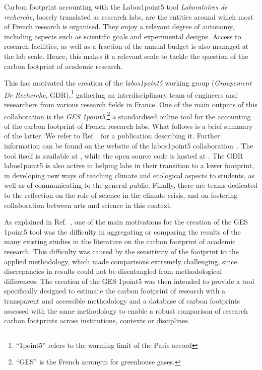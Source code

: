 \documentclass[../SustainableHEP.tex]{subfiles}
\begin{document}
\begin{bestpractice}
{Carbon footprint accounting with the Labos1point5 tool}%
\noindent \emph{Laboratoires de recherche}, loosely translated as research labs,
are the entities around which most of French research is organised.
They enjoy a relevant degree of autonomy, including 
aspects such as scientific goals and experimental designs. 
Access to research facilities, as well as 
a fraction of the annual budget is also managed at the lab scale.
Hence, this makes it a relevant scale to tackle the question 
of the carbon footprint of academic research. 

This has motivated the creation of the \emph{labos1point5} 
working group (\emph{Groupement De Recherche}, GDR),\footnote{``1point5''
refers to the warming limit of the Paris accord}
gathering an interdisciplinary team of engineers and researchers from various research fields in France. 
One of the main outputs of this collaboration is the \emph{GES 1point5},\footnote{``GES''
is the French acronym for greenhouse gases.} a
standardised online tool for the accounting of the carbon 
footprint of French research labs. What follows is a brief
summary of the latter. We refer to Ref.~\cite{labos1p5}
for a publication describing it. Further information 
can be found on the website of the labos1point5 collaboration~\cite{labos1p5web}. The tool itself is available at \cite{ges1p5}, 
while the open source code is hosted at \cite{ges1p5git}.
The GDR labos1point5 is also active in helping labs in their
transition to a lower footprint, in developing new ways of 
teaching climate and ecological aspects to students, as well
as of communicating to the general public. Finally,
there are  teams dedicated to the reflection on the role
of science in the climate crisis, and on fostering collaboration 
between arts and science in this context.

As explained in Ref.~\cite{labos1p5}, one of the main motivations for the 
creation of the GES 1point5 tool was the difficulty in aggregating or comparing the results of 
the many existing studies in the literature on the carbon footprint of academic research.
This difficulty was caused by the sensitivity of the footprint to the applied 
methodology, which made comparisons extremely challenging, since discrepancies in results
could not be disentangled from methodological differences. 
The creation of the GES 1point5 was then intended to provide 
a tool specifically designed to estimate the carbon footprint of research with a transparent
and accessible methodology and a database of carbon footprints assessed with the same
methodology to enable a robust comparison of research carbon footprints across institutions,
contexts or disciplines.


\end{bestpractice}
\end{document}
